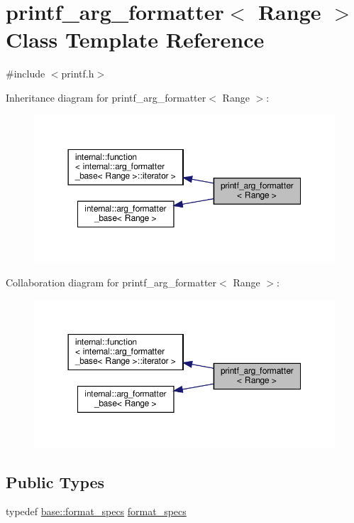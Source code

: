 \hypertarget{classprintf__arg__formatter}{}\section{printf\+\_\+arg\+\_\+formatter$<$ Range $>$ Class Template Reference}
\label{classprintf__arg__formatter}


{\ttfamily \#include $<$printf.\+h$>$}



Inheritance diagram for printf\+\_\+arg\+\_\+formatter$<$ Range $>$\+:
\nopagebreak
\begin{figure}[H]
\begin{center}
\leavevmode
\includegraphics[width=350pt]{classprintf__arg__formatter__inherit__graph}
\end{center}
\end{figure}


Collaboration diagram for printf\+\_\+arg\+\_\+formatter$<$ Range $>$\+:
\nopagebreak
\begin{figure}[H]
\begin{center}
\leavevmode
\includegraphics[width=350pt]{classprintf__arg__formatter__coll__graph}
\end{center}
\end{figure}
\subsection*{Public Types}
\begin{DoxyCompactItemize}
\item 
typedef \hyperlink{classinternal_1_1arg__formatter__base_acff46f7da1afa536210eb77a2ea0d775}{base\+::format\+\_\+specs} \hyperlink{classprintf__arg__formatter_ac9aa8ec04599fa4a6e0dc5645defc718}{format\+\_\+specs}
\end{DoxyCompactItemize}

